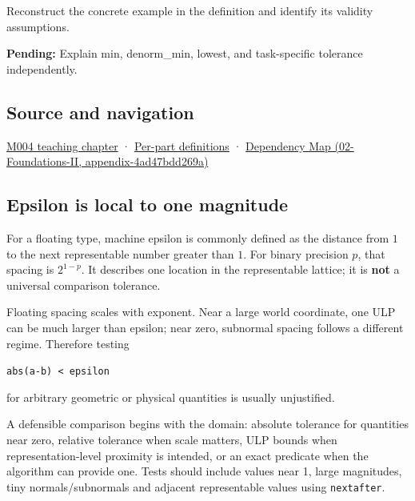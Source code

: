 Reconstruct the concrete example in the definition and identify its validity assumptions.

\textbf{Pending:} Explain min, denorm\_min, lowest, and task-specific tolerance independently.

\subsection{Source and navigation}\label{appendix-390ea641da54-source-and-navigation}

\hyperref[01-foundations-i-ch001-a-stretching-ruler-for-real-valued-quantities]{M004 teaching chapter} · \hyperref[appendix-fd090d982a15-m004---parts-61-76]{Per-part definitions} · \href{../02-Foundations-II/main.pdf\#nameddest=appendix-4ad47bdd269a}{Dependency Map (02-Foundations-II, appendix-4ad47bdd269a)}

\subsection{Epsilon is local to one magnitude}\label{appendix-390ea641da54-epsilon-is-local-to-one-magnitude}

For a floating type, machine epsilon is commonly defined as the distance from \(1\) to the next representable number greater than \(1\). For binary precision \(p\), that spacing is \(2^{1-p}\). It describes one location in the representable lattice; it is \textbf{not} a universal comparison tolerance.

Floating spacing scales with exponent. Near a large world coordinate, one ULP can be much larger than epsilon; near zero, subnormal spacing follows a different regime. Therefore testing

\texttt{abs(a-b)\ \textless{}\ epsilon}

for arbitrary geometric or physical quantities is usually unjustified.

A defensible comparison begins with the domain: absolute tolerance for quantities near zero, relative tolerance when scale matters, ULP bounds when representation-level proximity is intended, or an exact predicate when the algorithm can provide one. Tests should include values near 1, large magnitudes, tiny normals/subnormals and adjacent representable values using \texttt{nextafter}.

